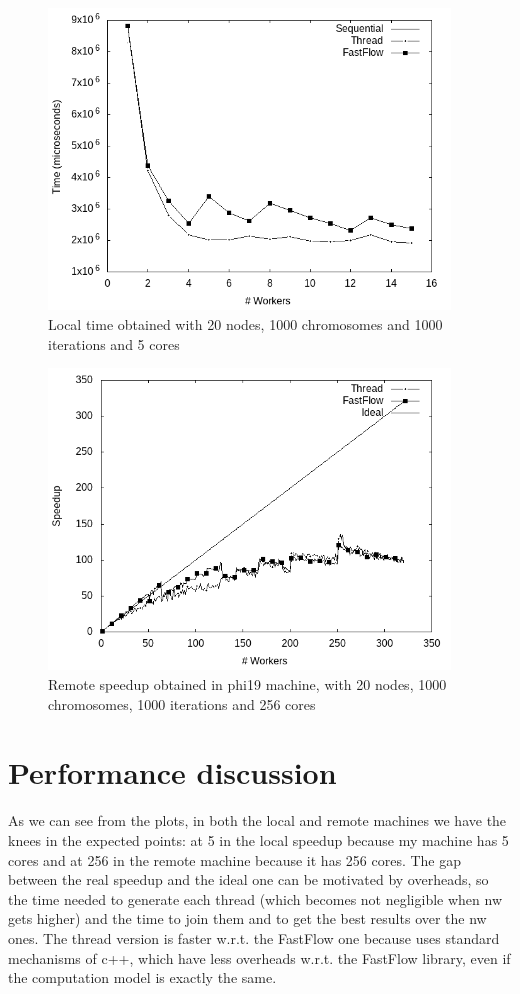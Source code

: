 \documentclass{article}
\begin{document}
    \begin{figure}
        \includegraphics[width=\linewidth, height=8cm]{img/local_time.png}
        \caption{Local time obtained with 20 nodes, 1000 chromosomes and 1000 iterations and 5 cores}
        \label{fig:localt}
    \end{figure}

    \begin{figure}
        \includegraphics[width=\linewidth, height=8cm]{img/remote_speedup.png}
        \caption{Remote speedup obtained in phi19 machine, with 20 nodes, 1000 chromosomes, 1000 iterations and 256 cores}
        \label{fig:remotes}
    \end{figure}

    \section{Performance discussion}
	As we can see from the plots, in both the local and remote machines we have the knees in the expected points: at 5 in the local speedup because my machine has 5 cores and at 256 in the remote machine because it has 256 cores. The gap between the real speedup and the ideal one can be motivated by overheads, so the time needed to generate each thread (which becomes not negligible when nw gets higher) and the time to join them and to get the best results over the nw ones. The thread version is faster w.r.t. the FastFlow one because uses standard mechanisms of c++, which have less overheads w.r.t. the FastFlow library, even if the computation model is exactly the same.
\end{document}
